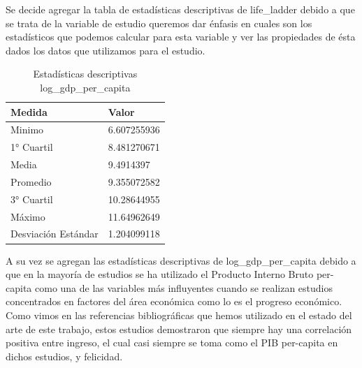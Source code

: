 Se decide agregar la tabla de estadísticas descriptivas de life\_ladder debido a que se trata de la variable de estudio queremos dar énfasis en cuales son los estadísticos que podemos calcular para esta variable y ver las propiedades de ésta dados los datos que utilizamos para el estudio. \\

\begin{table}[!ht]
\caption{Estadísticas descriptivas log\_gdp\_per\_capita}
    \centering
    \begin{tabular}{|l|l|}
    \hline
        Medida & Valor \\ \hline
        Minimo & 6.607255936 \\ \hline
        1° Cuartil & 8.481270671 \\ \hline
        Media & 9.4914397 \\ \hline
        Promedio & 9.355072582 \\ \hline
        3° Cuartil & 10.28644955 \\ \hline
        Máximo & 11.64962649 \\ \hline
        Desviación Estándar & 1.204099118 \\ \hline
    \end{tabular}
\end{table}

A su vez se agregan las estadísticas descriptivas de log\_gdp\_per\_capita debido a que en la mayoría de estudios se ha utilizado el Producto Interno Bruto per-capita como una de las variables más influyentes cuando se realizan estudios concentrados en factores del área económica como lo es el progreso económico. Como vimos en las referencias bibliográficas que hemos utilizado en el estado del arte de este trabajo, estos estudios demostraron que siempre hay una correlación positiva entre ingreso, el cual casi siempre se toma como el PIB per-capita en dichos estudios, y felicidad. \\ 

\newpage

